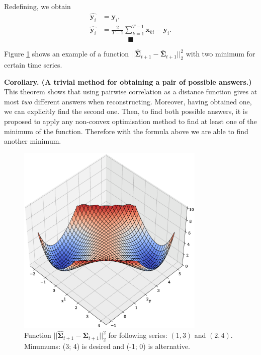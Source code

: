 \documentclass[12pt]{article}
\begin{document}
Redefining, we obtain
\begin{align*}
	\hat{\mathbf{y}_i} &= \mathbf{y}_i,\\
	\hat{\mathbf{y}_i} &= \frac{2}{T-1} \sum_{k=1}^{T-1} \mathbf{x}_{ki} - \mathbf{y}_i.
\end{align*}
$$ \blacksquare $$

Figure \ref{fig:fig2} shows an example of a function $||\hat{\mathbf{\Sigma}}_{t+1} - \bar{\mathbf{\Sigma}}_{t+1}||_2^2$ with two minimum for certain time series.

\textbf{Corollary. (A trivial method for obtaining a pair of possible answers.)} This theorem shows that using pairwise correlation as a distance function gives at most \emph{two} different answers when reconstructing. Moreover, having obtained one, we can explicitly find the second one. Then, to find both possible answers, it is proposed to apply any non-convex optimisation method to find at least one of the minimum of the function. Therefore with the formula above we are able to find another minimum.

\begin{figure}[!htbp]
	\centering
	\begin{center}
		\includegraphics[width=0.8\textwidth]{NonConvex.eps}
	\end{center}
	\caption{Function $||\hat{\mathbf{\Sigma}}_{t+1} - \bar{\mathbf{\Sigma}}_{t+1}||_2^2$ for following series: $(1, 3)$ and $(2, 4)$. Minumums: (3; 4) is desired and (-1; 0) is alternative.}
	\label{fig:fig2}
\end{figure}
\end{document}
